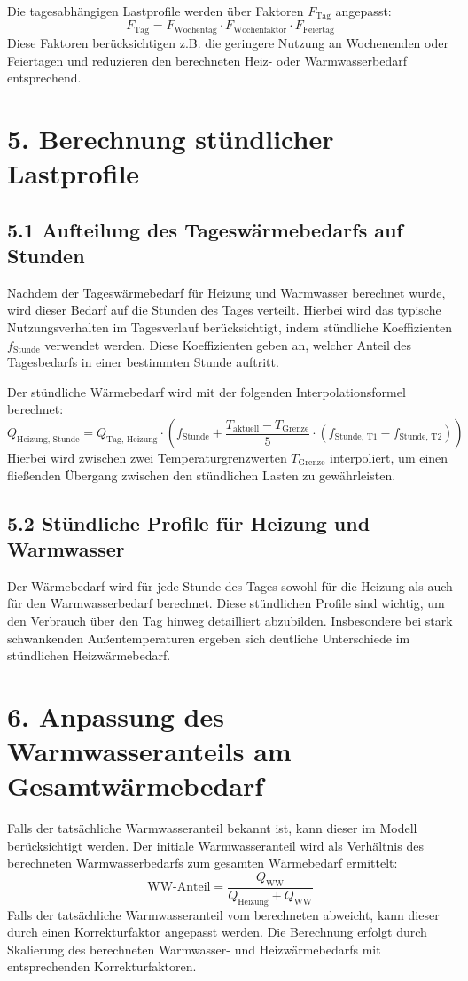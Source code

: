 \documentclass{article}
\begin{document}
Die tagesabhängigen Lastprofile werden über Faktoren \( F_{\text{Tag}} \) angepasst:
\[
F_{\text{Tag}} = F_{\text{Wochentag}} \cdot F_{\text{Wochenfaktor}} \cdot F_{\text{Feiertag}}
\]
Diese Faktoren berücksichtigen z.B. die geringere Nutzung an Wochenenden oder Feiertagen und reduzieren den berechneten Heiz- oder Warmwasserbedarf entsprechend.

\section*{5. Berechnung stündlicher Lastprofile}

\subsection*{5.1 Aufteilung des Tageswärmebedarfs auf Stunden}
Nachdem der Tageswärmebedarf für Heizung und Warmwasser berechnet wurde, wird dieser Bedarf auf die Stunden des Tages verteilt. Hierbei wird das typische Nutzungsverhalten im Tagesverlauf berücksichtigt, indem stündliche Koeffizienten \( f_{\text{Stunde}} \) verwendet werden. Diese Koeffizienten geben an, welcher Anteil des Tagesbedarfs in einer bestimmten Stunde auftritt.

Der stündliche Wärmebedarf wird mit der folgenden Interpolationsformel berechnet:
\[
Q_{\text{Heizung, Stunde}} = Q_{\text{Tag, Heizung}} \cdot \left( f_{\text{Stunde}} + \frac{T_{\text{aktuell}} - T_{\text{Grenze}}}{5} \cdot (f_{\text{Stunde, T1}} - f_{\text{Stunde, T2}}) \right)
\]
Hierbei wird zwischen zwei Temperaturgrenzwerten \( T_{\text{Grenze}} \) interpoliert, um einen fließenden Übergang zwischen den stündlichen Lasten zu gewährleisten.

\subsection*{5.2 Stündliche Profile für Heizung und Warmwasser}
Der Wärmebedarf wird für jede Stunde des Tages sowohl für die Heizung als auch für den Warmwasserbedarf berechnet. Diese stündlichen Profile sind wichtig, um den Verbrauch über den Tag hinweg detailliert abzubilden. Insbesondere bei stark schwankenden Außentemperaturen ergeben sich deutliche Unterschiede im stündlichen Heizwärmebedarf.

\section*{6. Anpassung des Warmwasseranteils am Gesamtwärmebedarf}
Falls der tatsächliche Warmwasseranteil bekannt ist, kann dieser im Modell berücksichtigt werden. Der initiale Warmwasseranteil wird als Verhältnis des berechneten Warmwasserbedarfs zum gesamten Wärmebedarf ermittelt:
\[
\text{WW-Anteil} = \frac{Q_{\text{WW}}}{Q_{\text{Heizung}} + Q_{\text{WW}}}
\]
Falls der tatsächliche Warmwasseranteil vom berechneten abweicht, kann dieser durch einen Korrekturfaktor angepasst werden. Die Berechnung erfolgt durch Skalierung des berechneten Warmwasser- und Heizwärmebedarfs mit entsprechenden Korrekturfaktoren.
\end{document}
